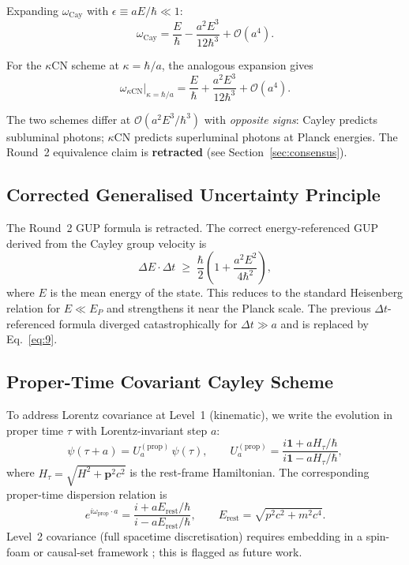 \documentclass[11pt,a4paper]{article}
\begin{document}
Expanding $\omega_{\mathrm{Cay}}$ with $\epsilon\equiv aE/\hbar\ll 1$:
\begin{equation}\label{eq:7}
  \omega_{\mathrm{Cay}} = \frac{E}{\hbar} - \frac{a^2 E^3}{12\hbar^3} + \mathcal{O}(a^4).
\end{equation}

For the $\kappa$CN scheme at $\kappa=\hbar/a$, the analogous expansion gives
\begin{equation}\label{eq:8}
  \omega_{\kappa\mathrm{CN}}\big|_{\kappa=\hbar/a} = \frac{E}{\hbar} + \frac{a^2 E^3}{12\hbar^3} + \mathcal{O}(a^4).
\end{equation}

The two schemes differ at $\mathcal{O}(a^2 E^3/\hbar^3)$ with \emph{opposite signs}: Cayley predicts subluminal photons; $\kappa$CN predicts superluminal photons at Planck energies. The Round~2 equivalence claim is \textbf{retracted} (see Section~\ref{sec:consensus}).

\subsection{Corrected Generalised Uncertainty Principle}

The Round~2 GUP formula is retracted. The correct energy-referenced GUP derived from the Cayley group velocity is
\begin{equation}\label{eq:9}
  \boxed{\Delta E\cdot\Delta t \;\geq\; \frac{\hbar}{2}\!\left(1+\frac{a^2 E^2}{4\hbar^2}\right),}
\end{equation}
where $E$ is the mean energy of the state. This reduces to the standard Heisenberg relation for $E\ll E_P$ and strengthens it near the Planck scale. The previous $\Delta t$-referenced formula diverged catastrophically for $\Delta t\gg a$ and is replaced by Eq.~\eqref{eq:9}.

\subsection{Proper-Time Covariant Cayley Scheme}

To address Lorentz covariance at Level~1 (kinematic), we write the evolution in proper time $\tau$ with Lorentz-invariant step $a$:
\begin{equation}\label{eq:10}
  \psi(\tau+a) = U_a^{(\mathrm{prop})}\,\psi(\tau),
  \qquad
  U_a^{(\mathrm{prop})} = \frac{i\mathbf{1}+aH_\tau/\hbar}{i\mathbf{1}-aH_\tau/\hbar},
\end{equation}
where $H_\tau=\sqrt{H^2+\mathbf{p}^2c^2}$ is the rest-frame Hamiltonian. The corresponding proper-time dispersion relation is
\begin{equation}\label{eq:11}
  e^{i\omega_{\mathrm{prop}}\cdot a}
  = \frac{i+aE_{\mathrm{rest}}/\hbar}{i-aE_{\mathrm{rest}}/\hbar},
  \qquad
  E_{\mathrm{rest}} = \sqrt{p^2c^2+m^2c^4}.
\end{equation}
Level~2 covariance (full spacetime discretisation) requires embedding in a spin-foam or causal-set framework \cite{henson2006,ashtekar2004,thiemann1996}; this is flagged as future work.
\end{document}
